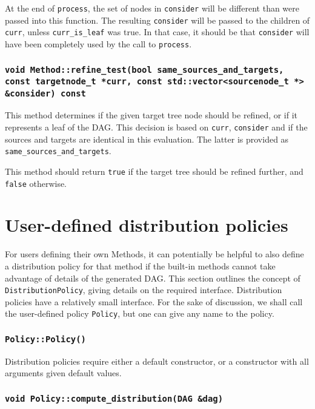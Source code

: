 At the end of \texttt{process}, the set of nodes in \texttt{consider} will be
different than were passed into this function. The resulting \texttt{consider}
will be passed to the children of \texttt{curr}, unless \texttt{curr\_is\_leaf}
was true. In that case, it should be that \texttt{consider} will have been
completely used by the call to \texttt{process}.

\subsubsection{\texttt{void Method::refine\_test(bool same\_sources\_and\_targets, const targetnode\_t *curr, const std::vector<sourcenode\_t *> \&consider) const}}

This method determines if the given target tree node should be refined, or if
it represents a leaf of the DAG. This decision is based on \texttt{curr},
\texttt{consider} and if the sources and targets are identical in this
evaluation. The latter is provided as \texttt{same\_sources\_and\_targets}.

This method should return \texttt{true} if the target tree should be refined
further, and \texttt{false} otherwise.



\section{User-defined distribution policies}

For users defining their own Methods, it can potentially be helpful to also
define a distribution policy for that method if the built-in methods cannot
take advantage of details of the generated DAG. This section outlines the
concept of \texttt{DistributionPolicy}, giving details on the required
interface. Distribution policies have a relatively small interface. For the
sake of discussion, we shall call the user-defined policy \texttt{Policy},
but one can give any name to the policy.

\subsubsection{\texttt{Policy::Policy()}}

Distribution policies require either a default constructor, or a constructor
with all arguments given default values.

\subsubsection{\texttt{void Policy::compute\_distribution(DAG \&dag)}}

